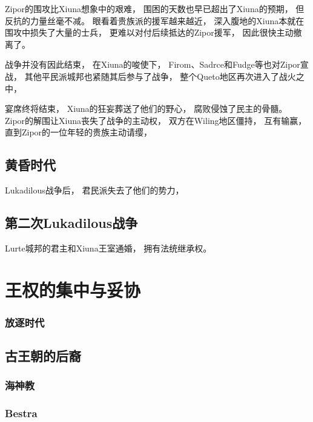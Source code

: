 \documentclass[UTF8,12pt,draft]{ctexbook}
\begin{document}
                Zipor的围攻比Xiuna想象中的艰难，
                围困的天数也早已超出了Xiuna的预期，
                但反抗的力量丝毫不减。
                眼看着贵族派的援军越来越近，
                深入腹地的Xiuna本就在围攻中损失了大量的士兵，
                更难以对付后续抵达的Zipor援军，
                因此很快主动撤离了。

                战争并没有因此结束，
                在Xiuna的唆使下，
                Firom、Sadrce和Fudge等也对Zipor宣战，
                其他平民派城邦也紧随其后参与了战争，
                整个Queto地区再次进入了战火之中，

                宴席终将结束，
                Xiuna的狂妄葬送了他们的野心，
                腐败侵蚀了民主的骨髓。
                Zipor的解围让Xiuna丧失了战争的主动权，
                双方在Wiling地区僵持，
                互有输赢，
                直到Zipor的一位年轻的贵族主动请缨，
                

            \subsection{黄昏时代}
                Lukadilous战争后，
                君民派失去了他们的势力，

            \subsection{第二次Lukadilous战争}
                Lurte城邦的君主和Xiuna王室通婚，
                拥有法统继承权。

        \section{王权的集中与妥协}
                \subsubsection{放逐时代}
            \subsection{古王朝的后裔}
                \subsubsection{海神教}
                \subsubsection{Bestra}
\end{document}
